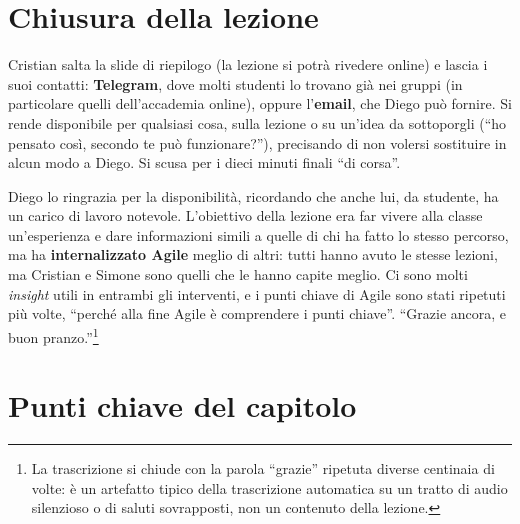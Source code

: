 \section{Chiusura della lezione}
\label{sec:z3-chiusura}

Cristian salta la slide di riepilogo (la lezione si potrà rivedere online) e
lascia i suoi contatti: \textbf{Telegram}, dove molti studenti lo trovano già nei
gruppi (in particolare quelli dell'accademia online), oppure l'\textbf{email},
che Diego può fornire. Si rende disponibile per qualsiasi cosa, sulla lezione o
su un'idea da sottoporgli (``ho pensato così, secondo te può funzionare?''),
precisando di non volersi sostituire in alcun modo a Diego. Si scusa per i dieci
minuti finali ``di corsa''.

Diego lo ringrazia per la disponibilità, ricordando che anche lui, da studente,
ha un carico di lavoro notevole. L'obiettivo della lezione era far vivere alla
classe un'esperienza e dare informazioni simili a quelle di chi ha fatto lo
stesso percorso, ma ha \textbf{internalizzato Agile} meglio di altri: tutti hanno
avuto le stesse lezioni, ma Cristian e Simone sono quelli che le hanno capite
meglio. Ci sono molti \emph{insight} utili in entrambi gli interventi, e i punti
chiave di Agile sono stati ripetuti più volte, ``perché alla fine Agile è
comprendere i punti chiave''. ``Grazie ancora, e buon pranzo.''\footnote{La
trascrizione si chiude con la parola ``grazie'' ripetuta diverse centinaia di
volte: è un artefatto tipico della trascrizione automatica su un tratto di
audio silenzioso o di saluti sovrapposti, non un contenuto della lezione.}

\section*{Punti chiave del capitolo}

